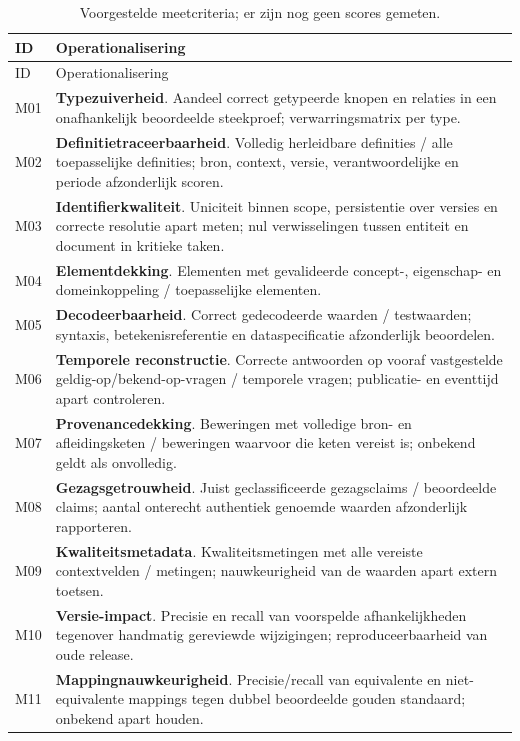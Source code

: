 \begin{longtable}{@{}P{.07\linewidth}P{.84\linewidth}@{}}
\caption{Voorgestelde meetcriteria; er zijn nog geen scores gemeten.}\label{tab:metrics}\\
\toprule ID & Operationalisering \\ \midrule\endfirsthead
\toprule ID & Operationalisering \\ \midrule\endhead
M01 & \textbf{Typezuiverheid}. Aandeel correct getypeerde knopen en relaties in een onafhankelijk beoordeelde steekproef; verwarringsmatrix per type. \\
M02 & \textbf{Definitietraceerbaarheid}. Volledig herleidbare definities / alle toepasselijke definities; bron, context, versie, verantwoordelijke en periode afzonderlijk scoren. \\
M03 & \textbf{Identifierkwaliteit}. Uniciteit binnen scope, persistentie over versies en correcte resolutie apart meten; nul verwisselingen tussen entiteit en document in kritieke taken. \\
M04 & \textbf{Elementdekking}. Elementen met gevalideerde concept-, eigenschap- en domeinkoppeling / toepasselijke elementen. \\
M05 & \textbf{Decodeerbaarheid}. Correct gedecodeerde waarden / testwaarden; syntaxis, betekenisreferentie en dataspecificatie afzonderlijk beoordelen. \\
M06 & \textbf{Temporele reconstructie}. Correcte antwoorden op vooraf vastgestelde geldig-op/bekend-op-vragen / temporele vragen; publicatie- en eventtijd apart controleren. \\
M07 & \textbf{Provenancedekking}. Beweringen met volledige bron- en afleidingsketen / beweringen waarvoor die keten vereist is; onbekend geldt als onvolledig. \\
M08 & \textbf{Gezagsgetrouwheid}. Juist geclassificeerde gezagsclaims / beoordeelde claims; aantal onterecht authentiek genoemde waarden afzonderlijk rapporteren. \\
M09 & \textbf{Kwaliteitsmetadata}. Kwaliteitsmetingen met alle vereiste contextvelden / metingen; nauwkeurigheid van de waarden apart extern toetsen. \\
M10 & \textbf{Versie-impact}. Precisie en recall van voorspelde afhankelijkheden tegenover handmatig gereviewde wijzigingen; reproduceerbaarheid van oude release. \\
M11 & \textbf{Mappingnauwkeurigheid}. Precisie/recall van equivalente en niet-equivalente mappings tegen dubbel beoordeelde gouden standaard; onbekend apart houden. \\

\end{longtable}
